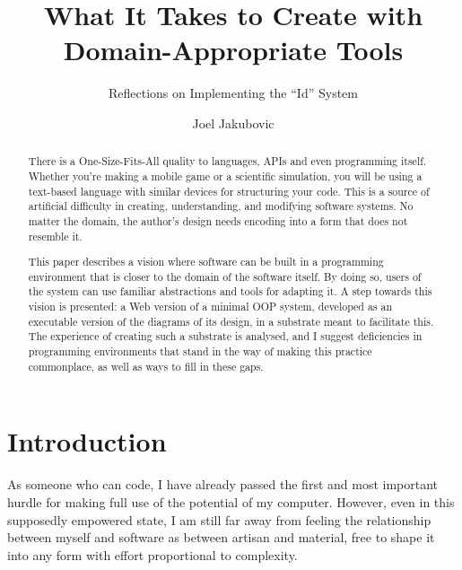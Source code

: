 \newcommand{\OROM}{Id}
\title{What It Takes to Create with Domain-Appropriate Tools}
\subtitle{Reflections on Implementing the ``Id{}'' System}
\author{Joel Jakubovic}

\newcommand{\joel}[1]{}
\newcommand{\svgel}[1]{\texttt{\textless{}#1\textgreater{}}}
\newcommand{\OSFA}{One-Size-Fits-All}
\newcommand{\xywh}{\texttt{x},\texttt{y},\texttt{width},\texttt{height}}

\begin{abstract}
There is a One-Size-Fits-All{} quality to languages, APIs and even programming itself. Whether you're making a mobile game or a scientific simulation, you will be using a text-based language with similar devices for structuring your code. This is a source of artificial difficulty in creating, understanding, and modifying software systems. No matter the domain, the author's design needs encoding into a form that does not resemble it.

This paper describes a vision where software can be built in a programming environment that is closer to the domain of the software itself. By doing so, users of the system can use familiar abstractions and tools for adapting it. A step towards this vision is presented: a Web version of a minimal OOP system, developed as an executable version of the diagrams of its design, in a substrate meant to facilitate this. The experience of creating such a substrate is analysed, and I suggest deficiencies in programming environments that stand in the way of making this practice commonplace, as well as ways to fill in these gaps.
\end{abstract}

\maketitle


\hypertarget{introduction}{%
\section{Introduction}\label{introduction}}

As someone who can code, I have already passed the first and most
important hurdle for making full use of the potential of my computer.
However, even in this supposedly empowered state, I am still far away
from feeling the relationship between myself and software as between
artisan and material, free to shape it into any form with effort
proportional to complexity.

